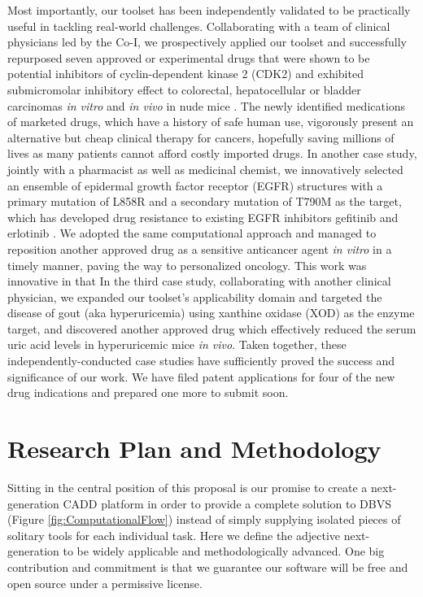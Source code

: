 \documentclass[a4paper,12pt]{article}
\begin{document}
Most importantly, our toolset has been independently validated to be practically useful in tackling real-world challenges. Collaborating with a team of clinical physicians led by the Co-I, we prospectively applied our toolset and successfully repurposed seven approved or experimental drugs that were shown to be potential inhibitors of cyclin-dependent kinase 2 (CDK2) and exhibited submicromolar inhibitory effect to colorectal, hepatocellular or bladder carcinomas \textit{in vitro} and \textit{in vivo} in nude mice \citep{1667,1681}. The newly identified medications of marketed drugs, which have a history of safe human use, vigorously present an alternative but cheap clinical therapy for cancers, hopefully saving millions of lives as many patients cannot afford costly imported drugs. In another case study, jointly with a pharmacist as well as medicinal chemist, we innovatively selected an ensemble of epidermal growth factor receptor (EGFR) structures with a primary mutation of L858R and a secondary mutation of T790M as the target, which has developed drug resistance to existing EGFR inhibitors gefitinib and erlotinib \citep{1815}. We adopted the same computational approach and managed to reposition another approved drug as a sensitive anticancer agent \textit{in vitro} in a timely manner, paving the way to personalized oncology. This work was innovative in that  In the third case study, collaborating with another clinical physician, we expanded our toolset's applicability domain and targeted the disease of gout (aka hyperuricemia) using xanthine oxidase (XOD) as the enzyme target, and discovered another approved drug which effectively reduced the serum uric acid levels in hyperuricemic mice \textit{in vivo}. Taken together, these independently-conducted case studies have sufficiently proved the success and significance of our work. We have filed patent applications for four of the new drug indications and prepared one more to submit soon.

\section*{Research Plan and Methodology}

Sitting in the central position of this proposal is our promise to create a next-generation CADD platform in order to provide a complete solution to DBVS (Figure \ref{fig:ComputationalFlow}) instead of simply supplying isolated pieces of solitary tools for each individual task. Here we define the adjective next-generation to be widely applicable and methodologically advanced. One big contribution and commitment is that we guarantee our software will be free and open source under a permissive license.
\end{document}
